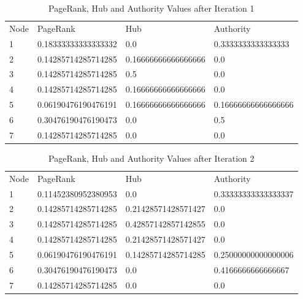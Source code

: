 \documentclass[12pt]{report}
\begin{document}
\begin{table}[]
\centering
\caption{PageRank, Hub and Authority Values after Iteration 1}
\label{my-label}
\begin{tabular}{llll}
Node & PageRank            & Hub                 & Authority           \\
1    & 0.18333333333333332 & 0.0                 & 0.3333333333333333  \\
2    & 0.14285714285714285 & 0.16666666666666666 & 0.0                 \\
3    & 0.14285714285714285 & 0.5                 & 0.0                 \\
4    & 0.14285714285714285 & 0.16666666666666666 & 0.0                 \\
5    & 0.06190476190476191 & 0.16666666666666666 & 0.16666666666666666 \\
6    & 0.30476190476190473 & 0.0                 & 0.5                 \\
7    & 0.14285714285714285 & 0.0                 & 0.0                
\end{tabular}
\end{table}   

\begin{table}[]
\centering
\caption{PageRank, Hub and Authority Values after Iteration 2}
\label{my-label}
\begin{tabular}{llll}
Node & PageRank            & Hub                 & Authority           \\
1    & 0.11452380952380953 & 0.0                 & 0.33333333333333337 \\
2    & 0.14285714285714285 & 0.21428571428571427 & 0.0                 \\
3    & 0.14285714285714285 & 0.42857142857142855 & 0.0                 \\
4    & 0.14285714285714285 & 0.21428571428571427 & 0.0                 \\
5    & 0.06190476190476191 & 0.14285714285714285 & 0.25000000000000006 \\
6    & 0.30476190476190473 & 0.0                 & 0.4166666666666667  \\
7    & 0.14285714285714285 & 0.0                 & 0.0                
\end{tabular}
\end{table}
\end{document}
